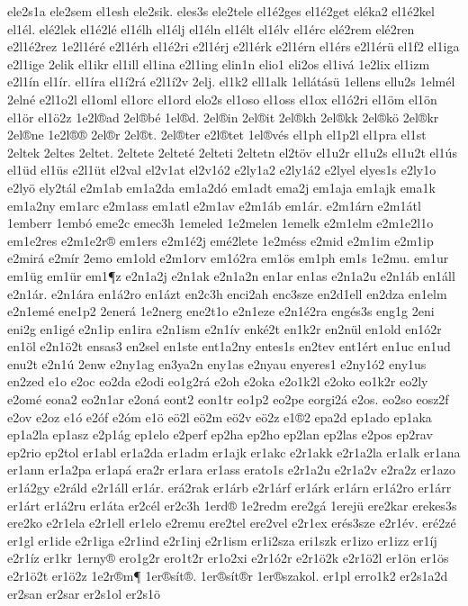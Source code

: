 {ele2s1a
ele2sem
el1esh
ele2sik.
eles3s
ele2tele
el1é2ges
el1é2get
eléka2
el1é2kel
el1él.
elé2lek
el1é2lé
el1élh
el1élj
el1éln
el1élt
el1élv
el1érc
elé2rem
elé2ren
e2l1é2rez
1e2l1éré
e2l1érh
el1é2ri
e2l1érj
e2l1érk
e2l1érn
el1érs
e2l1érü
el1f2
el1iga
e2l1ige
2elik
el1ikr
el1ill
el1ina
e2l1ing
elin1n
elio1
eli2os
el1ivá
1e2lix
el1izm
e2l1ín
el1ír.
el1íra
el1í2rá
e2l1í2v
2elj.
el1k2
ell1alk
1ellátásü
1ellens
ellu2s
1elmél
2elné
e2l1o2l
el1oml
el1orc
el1ord
elo2s
el1oso
el1oss
el1ox
el1ó2ri
el1öm
el1ön
el1ör
el1ö2z
1e2l®ad
2el®bé
1el®d.
2el®in
2el®it
2el®kh
2el®kk
2el®kö
2el®kr
2el®ne
1e2l®®
2el®r
2el®t.
2el®ter
e2l®tet
1el®vés
el1ph
el1p2l
el1pra
el1st
2eltek
2eltes
2eltet.
2eltete
2elteté
2elteti
2eltetn
el2töv
el1u2r
el1u2s
el1u2t
el1ús
el1üd
el1üs
e2l1üt
el2val
el2v1at
el2v1ó2
e2ly1a2
e2ly1á2
e2lyel
elyes1s
e2ly1o
e2lyö
ely2tál
e2m1ab
em1a2da
em1a2dó
em1adt
ema2j
em1aja
em1ajk
ema1k
em1a2ny
em1arc
e2m1ass
em1atl
e2m1av
e2m1áb
em1ár.
e2m1árn
e2m1átl
1emberr
1embó
eme2c
emec3h
1emeled
1e2melen
1emelk
e2m1elm
e2m1e2l1o
em1e2res
e2m1e2r®
em1ers
e2m1é2j
emé2lete
1e2méss
e2mid
e2m1im
e2m1ip
e2mirá
e2mír
2emo
em1old
e2m1orv
em1ó2ra
em1ös
em1ph
em1s
1e2mu.
em1ur
em1üg
em1ür
em1¶z
e2n1a2j
e2n1ak
e2n1a2n
en1ar
en1as
e2n1a2u
e2n1áb
en1áll
e2n1ár.
e2n1ára
en1á2ro
en1ázt
en2c3h
enci2ah
enc3sze
en2d1ell
en2dza
en1elm
e2n1emé
ene1p2
2enerá
1e2nerg
ene2t1o
e2n1eze
e2n1é2ra
engés3s
eng1g
2eni
eni2g
en1igé
e2n1ip
en1ira
e2n1ism
e2n1ív
enké2t
en1k2r
en2nül
en1old
en1ó2r
en1öl
e2n1ö2t
ensas3
en2sel
en1ste
ent1a2ny
entes1s
en2tev
ent1ért
en1uc
en1ud
enu2t
e2n1ú
2enw
e2ny1ag
en3ya2n
eny1as
e2nyau
enyeres1
e2ny1ó2
eny1us
en2zed
e1o
e2oc
eo2da
e2odi
eo1g2rá
e2oh
e2oka
e2o1k2l
e2oko
eo1k2r
eo2ly
e2omé
eona2
eo2n1ar
e2oná
eont2
eon1tr
eo1p2
eo2pe
eorgi2á
e2os.
eo2so
eosz2f
e2ov
e2oz
e1ó
e2óf
e2óm
e1ö
eö2l
eö2m
eö2v
eö2z
e1®2
epa2d
ep1ado
ep1aka
ep1a2la
ep1asz
e2p1ág
ep1elo
e2perf
ep2ha
ep2ho
ep2lan
ep2las
e2pos
ep2rav
ep2rio
ep2tol
er1abl
er1a2da
er1adm
er1ajk
er1akc
e2r1akk
e2r1a2la
er1alk
er1ana
er1ann
er1a2pa
er1apá
era2r
er1ara
er1ass
erato1s
e2r1a2u
e2r1a2v
e2ra2z
er1azo
er1á2gy
e2ráld
e2r1áll
er1ár.
erá2rak
er1árb
e2r1árf
er1árk
er1árn
er1á2ro
er1árr
er1árt
er1á2ru
er1áta
er2cél
er2c3h
1erd®
1e2redm
ere2gá
1erejü
ere2kar
erekes3s
ere2ko
e2r1ela
e2r1ell
er1elo
e2remu
ere2tel
ere2vel
e2r1ex
erés3sze
e2r1év.
eré2zé
er1gl
er1ide
e2r1iga
e2r1ind
e2r1inj
e2r1ism
er1i2sza
eri1szk
er1izo
er1izz
er1íj
e2r1íz
er1kr
1erny®
ero1g2r
ero1t2r
er1o2xi
e2r1ó2r
e2r1ö2k
e2r1ö2l
er1ön
er1ös
e2r1ö2t
er1ö2z
1e2r®m¶
1er®sít®.
1er®sít®r
1er®szakol.
er1pl
erro1k2
er2s1a2d
er2san
er2sar
er2s1ol
er2s1ö
}
